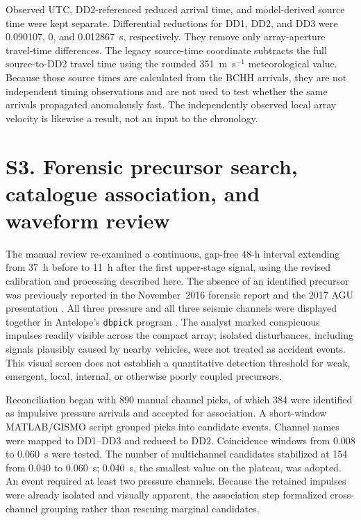 \documentclass[]{seismica}
\begin{document}
\FloatBarrier

Observed UTC, DD2-referenced reduced arrival time, and model-derived source
time were kept separate. Differential reductions for DD1, DD2, and DD3 were
0.090107, 0, and 0.012867~s, respectively. They remove only array-aperture
travel-time differences. The legacy source-time coordinate subtracts the full
source-to-DD2 travel time using the rounded 351~m~s$^{-1}$ meteorological
value. Because those source times are calculated from the BCHH arrivals, they
are not independent timing observations and are not used to test whether the
same arrivals propagated anomalously fast. The independently observed local
array velocity is likewise a result, not an input to the chronology.

\FloatBarrier

\section*{S3. Forensic precursor search, catalogue association, and waveform review}
\label{sec:supp_catalogue}

The manual review re-examined a continuous, gap-free 48-h interval extending
from 37~h before to 11~h after the first upper-stage signal, using the revised
calibration and processing described here. The absence of an identified
precursor was previously reported in the November~2016 forensic report
\citep{thompson_mcnutt_fireball_2016} and the 2017 AGU presentation
\citep{thompson_agu_falcon9_2017}. All three pressure and all three seismic
channels were displayed together in Antelope's \texttt{dbpick} program
\citep{brtt_antelope}. The analyst marked conspicuous impulses readily visible
across the compact array; isolated disturbances, including signals plausibly
caused by nearby vehicles, were not treated as accident events. This visual
screen does not establish a quantitative detection threshold for weak,
emergent, local, internal, or otherwise poorly coupled precursors.

Reconciliation began with 890 manual channel picks, of which 384 were
identified as impulsive pressure arrivals and accepted for association. A short-window MATLAB/GISMO script
\citep{thompson_gismo_2017} grouped picks into candidate events. Channel names
were mapped to DD1--DD3 and reduced to
DD2. Coincidence windows from 0.008 to 0.060~s were tested. The number of
multichannel candidates stabilized at 154 from 0.040 to 0.060~s; 0.040~s, the
smallest value on the plateau, was adopted. An event required at least two
pressure channels. Because the retained impulses were already isolated and
visually apparent, the association step formalized cross-channel grouping
rather than rescuing marginal candidates.
\end{document}
